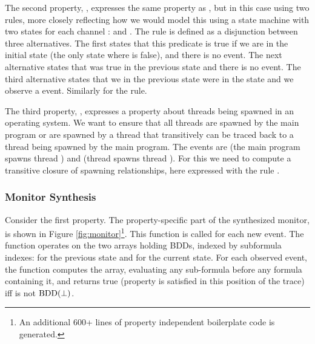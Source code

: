 The second property, , expresses the same 
property as , but in this case using two 
rules, more closely reflecting how we would model this using a state machine with two states for each channel : 
 and . The rule  is defined as a disjunction between three alternatives. The first states that this predicate is true if we are in the initial state 
(the only state where  is false), and there is no  event. The next alternative states that
 was true in the previous state and there is
no  event.
The third alternative states that we in the previous state were
in the  state and we observe a  
event. Similarly for the  rule.

The third property, , expresses a property
about threads being spawned in an operating system. We want to 
ensure that all threads are spawned by the main program or are spawned by a thread that transitively can be traced back to a thread being spawned by the main program. The events are
 (the main program spawns thread ) and
 (thread  spawns thread ).
For this we need to compute a transitive closure of spawning relationships, here expressed with the rule .

\subsubsection{Monitor Synthesis}

Consider the first  property. The property-specific 
part of the synthesized monitor, is shown 
in Figure \ref{fig:monitor}\footnote{An additional 600+ lines of property independent 
boilerplate code is generated.}. This function is called for each new event. The function operates on the two arrays holding BDDs, indexed by subformula indexes:  for the previous state and  for the current state. For each observed event, the function  computes the  array, evaluating any sub-formula before any formula containing it,
and returns true (property is satisfied in this position of the trace)  iff  is not $\mathrm{BDD}(\bot)$. 

